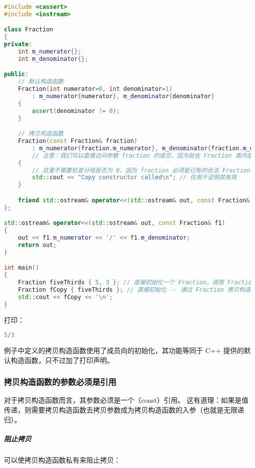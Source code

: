 \documentclass[../../LearnCpp.tex]{subfiles}
\begin{document}
\begin{lstlisting}[language=C++]
#include <cassert>
#include <iostream>

class Fraction
{
private:
    int m_numerator{};
    int m_denominator{};

public:
    // 默认构造函数
    Fraction(int numerator=0, int denominator=1)
        : m_numerator{numerator}, m_denominator{denominator}
    {
        assert(denominator != 0);
    }

    // 拷贝构造函数
    Fraction(const Fraction& fraction)
        : m_numerator{fraction.m_numerator}, m_denominator{fraction.m_denominator}
        // 注意：我们可以直接访问参数 fraction 的成员，因为处在 Fraction 类内部
    {
        // 这里不需要检查分母是否为 0，因为 fraction 必须是已有的合法 Fraction
        std::cout << "Copy constructor called\n"; // 仅用于证明其有效
    }

    friend std::ostream& operator<<(std::ostream& out, const Fraction& f1);
};

std::ostream& operator<<(std::ostream& out, const Fraction& f1)
{
	out << f1.m_numerator << '/' << f1.m_denominator;
	return out;
}

int main()
{
	Fraction fiveThirds { 5, 3 }; // 直接初始化一个 Fraction，调用 Fraction(int, int) 构造函数
	Fraction fCopy { fiveThirds }; // 直接初始化 -- 通过 Fraction 拷贝构造函数
	std::cout << fCopy << '\n';
}
\end{lstlisting}

打印：

\begin{lstlisting}[language=C++]
5/3
\end{lstlisting}

例子中定义的拷贝构造函数使用了成员向的初始化，其功能等同于 C++ 提供的默认构造函数，只不过加了打印声明。

\subsubsection*{拷贝构造函数的参数必须是引用}

对于拷贝构造函数而言，其参数必须是一个（const）引用。
这有道理：如果是值传递，则需要拷贝构造函数去拷贝参数成为拷贝构造函数的入参（也就是无限递归）。

\subparagraph*{阻止拷贝}

可以使拷贝构造函数私有来阻止拷贝：
\end{document}
